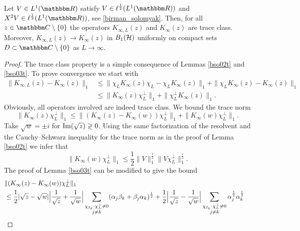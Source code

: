 \begin{lemma}\label{bso04t}
Let $V\in L^1(\R)$ satisfy $V\in\ell^{\frac{1}{2}}(L^1(\R))$ and $X^2V\in\ell^{\frac{1}{2}}(L^1(\R))$, see \eqref{birman_solomyak}.
Then, for all $z\in\C\setminus\{0\}$ the operators $K_{\infty,L}(z)$ and $K_\infty(z)$ are trace class.
Moreover, $K_{\infty,L}(z)\to K_\infty(z)$ in $B_1({\mathcal H})$ uniformly on 
compact sets $D\subset\C\setminus\{0\}$ as $L\to\infty$.
\end{lemma}
\begin{proof}
The trace class property is a simple consequence of Lemmas \ref{bso02t} and \ref{bso03t}.
To prove convergence we start with
\begin{equation*}
\begin{split}
  \|K_{\infty,L}(z) - K_\infty(z)\|_1
    & \leq \|\chi_L K_\infty(z)\chi_L - \chi_L K_\infty(z)\|_1
          + \|\chi_L K_\infty(z) - K_\infty(z) \|_1 \\
    & \leq \|K_\infty(z)\chi_L^\perp \|_1 + \| \chi_L^\perp K_\infty(z) \|_1 .
\end{split}
\end{equation*}
Obviously, all operators involved are indeed trace class. We bound the trace norm
\begin{equation*}
  \|K_\infty(z)\chi_L^\perp \|_1 \leq \| (K_\infty(z) - K_\infty(w))\chi_L^\perp \|_1 + \| K_\infty(w)\chi_L^\perp\|_1 .
\end{equation*}
Take $\sqrt{w}=\pm i$ for $\operatorname{Im}(\sqrt{z})\gtrless 0$. Using the same factorization of the resolvent 
and the Cauchy--Schwarz inequality for the trace norm as in the proof of Lemma \ref{bso02t} we infer that
\begin{equation*}
  \| K_\infty(w) \chi_L^\perp \|_1 \leq \frac{1}{2} \|V\|_1^{\frac{1}{2}} \|V\chi_L^\perp\|_1^{\frac{1}{2}} .
\end{equation*}
The proof of Lemma \ref{bso03t} can be modified to give the bound
\begin{equation*}
\begin{split}
\lefteqn{\| (K_\infty(z) - K_\infty(w))\chi_L^\perp \|_1}\\
   & \leq \frac{1}{2} |\sqrt{z}-\sqrt{w}| \Big|\frac{1}{\sqrt{z}} 
            + \frac{1}{\sqrt{w}}\Big| \sum_{\substack{\chi_{I_k}\cdot\chi_L^\perp\neq 0\\j\neq k}} (\alpha_j\beta_k+\beta_j\alpha_k)^{\frac{1}{2}} 
            + \frac{1}{2}\Big|\frac{1}{\sqrt{z}} - \frac{1}{\sqrt{w}}\Big| 
                 \sum_{\substack{\chi_{I_k}\cdot\chi_L^\perp\neq 0\\j\neq k}} \alpha_j^{\frac{1}{2}} \alpha_k^{\frac{1}{2}} \\

\end{split}
\end{equation*}
\end{proof}
